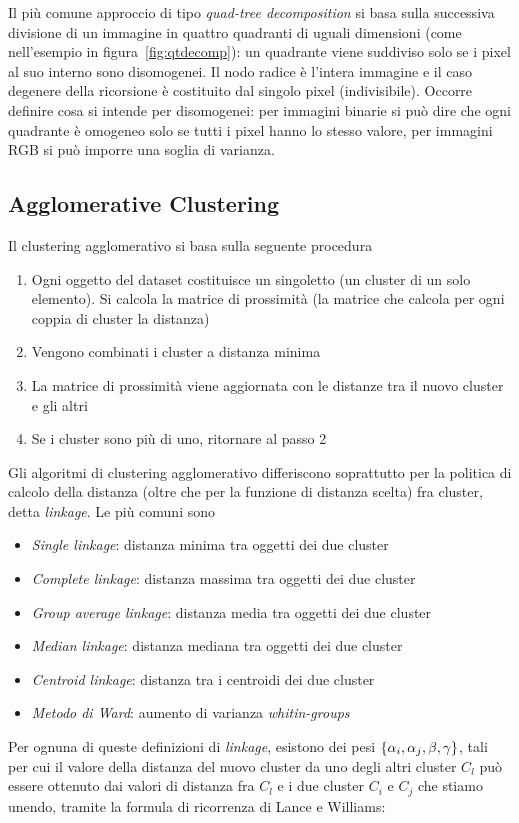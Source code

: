 \documentclass[\main/main.tex]{subfiles}
\begin{document}
Il più comune approccio di tipo \textit{quad-tree decomposition} si basa sulla successiva divisione di un immagine in quattro quadranti di uguali dimensioni (come nell'esempio in figura~\ref{fig:qtdecomp}): un quadrante viene suddiviso solo se i pixel al suo interno sono disomogenei. Il nodo radice è l'intera immagine e il caso degenere della ricorsione è costituito dal singolo pixel (indivisibile). Occorre definire cosa si intende per disomogenei: per immagini binarie si può dire che ogni quadrante è omogeneo solo se tutti i pixel hanno lo stesso valore, per immagini RGB si può imporre una soglia di varianza.

\subsection{Agglomerative Clustering}
Il clustering agglomerativo si basa sulla seguente procedura \begin{enumerate}
	\item Ogni oggetto del dataset costituisce un singoletto (un cluster di un solo elemento). Si calcola la matrice di prossimità (la matrice che calcola per ogni coppia di cluster la distanza)
	\item Vengono combinati i cluster a distanza minima
	\item La matrice di prossimità viene aggiornata con le distanze tra il nuovo cluster e gli altri
	\item Se i cluster sono più di uno, ritornare al passo 2
\end{enumerate}
Gli algoritmi di clustering agglomerativo differiscono soprattutto per la politica di calcolo della distanza (oltre che per la funzione di distanza scelta) fra cluster, detta \textit{linkage}. Le più comuni sono\begin{itemize}
	\item \textit{Single linkage}: distanza minima tra oggetti dei due cluster
	\item \textit{Complete linkage}: distanza massima tra oggetti dei due cluster
	\item \textit{Group average linkage}: distanza media tra oggetti dei due cluster
	\item \textit{Median linkage}: distanza mediana tra oggetti dei due cluster
	\item \textit{Centroid linkage}: distanza tra i centroidi dei due cluster
	\item \textit{Metodo di Ward}: aumento di varianza \textit{whitin-groups}
\end{itemize}
Per ognuna di queste definizioni di \textit{linkage}, esistono dei pesi $\left\lbrace  \alpha_i , \alpha_j , \beta , \gamma  \right\rbrace$, tali per cui il valore della distanza del nuovo cluster da uno degli altri cluster $C_l$ può essere ottenuto dai valori di distanza fra $C_l$ e i due cluster $C_i$ e $C_j$ che stiamo unendo, tramite la formula di ricorrenza di Lance e Williams:
\end{document}
